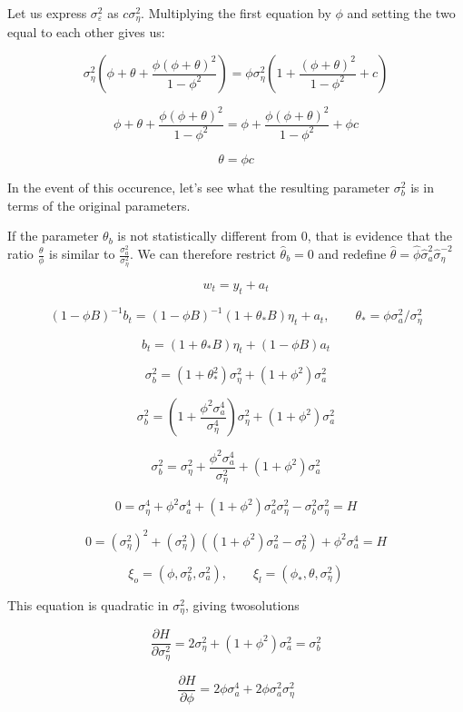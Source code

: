 Let us express $\sigma_\varepsilon^2$ as $c\sigma_\eta^2$. Multiplying the first equation by $\phi$ and setting the two equal to each other gives us:

$$ \sigma_\eta^2(\phi + \theta + \frac{\phi(\phi + \theta)^2}{1 - \phi^2}) = \phi\sigma_\eta^2(1 + \frac{(\phi + \theta)^2}{1 - \phi^2} + c)$$

$$ \phi + \theta + \frac{\phi(\phi + \theta)^2}{1 - \phi^2} = \phi + \frac{\phi(\phi + \theta)^2}{1 - \phi^2} + \phi c$$

$$ \theta  =  \phi c$$

In the event of this occurence, let's see what the resulting parameter $\sigma_b^2$ is in terms of the original parameters.

If the parameter $\theta_b$ is not statistically different from $0$, that is evidence that the ratio $\frac{\theta}{\phi}$ is similar to $\frac{\sigma_a^2}{\sigma_\eta^2}$. We can therefore restrict $\hat{\theta}_b = 0$ and redefine $\hat{\theta} = \hat{\phi}\hat{\sigma}_a^2\hat{\sigma}_\eta^{-2}$ 

$$w_t = y_t + a_t$$

$$(1-\phi B)^{-1}b_t = (1 - \phi B)^{-1}(1 + \theta_* B)\eta_t + a_t, \qquad \theta_* = \phi\sigma_a^2 / \sigma_\eta^2$$

$$ b_t = (1 + \theta_*B)\eta_t + (1 - \phi B)a_t $$

$$ \sigma_b^2 = (1 + \theta_*^2)\sigma_\eta^2 + (1 + \phi^2)\sigma_a^2 $$

$$ \sigma_b^2 = (1 + \frac{\phi^2\sigma_a^4}{\sigma_\eta^4})\sigma_\eta^2 + (1 + \phi^2)\sigma_a^2 $$

$$ \sigma_b^2 = \sigma_\eta^2 + \frac{\phi^2\sigma_a^4}{\sigma_\eta^2} + (1 + \phi^2)\sigma_a^2 $$

$$ 0 = \sigma_\eta^4 + \phi^2\sigma_a^4 + (1 + \phi^2)\sigma_a^2\sigma_\eta^2 - \sigma_b^2\sigma_\eta^2 = H $$

$$ 0 = (\sigma_\eta^2)^2 + 
(\sigma_\eta^2)((1 + \phi^2)\sigma_a^2 - \sigma_b^2) +
\phi^2\sigma_a^4 = H $$

$$ \xi_o = (\phi, \sigma_b^2, \sigma_a^2),\qquad \xi_l= (\phi_*,\theta,\sigma_\eta^2)$$

This equation is quadratic in $\sigma_\eta^2$, giving twosolutions

$$\frac{\partial H}{\partial \sigma_\eta^2} = 2\sigma_\eta^2 + (1 + \phi^2)\sigma_a^2 = \sigma_b^2$$

$$\frac{\partial H}{\partial\phi} = 2\phi \sigma_a^4 + 2\phi\sigma_a^2\sigma_\eta^2 $$

